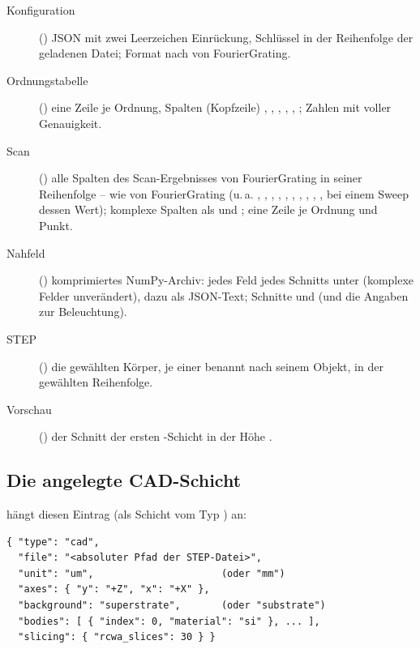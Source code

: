 \begin{description}
  \item[Konfiguration] () JSON mit zwei Leerzeichen Einrückung, Schlüssel in
    der Reihenfolge der geladenen Datei; Format nach  von
    FourierGrating.
  \item[Ordnungstabelle] () eine Zeile je Ordnung, Spalten (Kopfzeile) , , , , , ; Zahlen mit voller Genauigkeit.
  \item[Scan] () alle Spalten des Scan-Ergebnisses von FourierGrating in seiner
    Reihenfolge -- wie  von FourierGrating (u.\,a. ,
    , , , , , ,
    , , , bei einem Sweep dessen Wert); komplexe Spalten
    als  und ; eine Zeile je Ordnung und Punkt.
  \item[Nahfeld] () komprimiertes NumPy-Archiv: jedes Feld jedes Schnitts unter
     (komplexe Felder unverändert), dazu  als JSON-Text;
    Schnitte  und  (und die Angaben zur Beleuchtung).
  \item[STEP] () die gewählten Körper, je einer benannt nach seinem Objekt, in der
    gewählten Reihenfolge.
  \item[Vorschau] () der Schnitt der ersten -Schicht in der Höhe
    .
\end{description}

\subsection{Die angelegte CAD-Schicht}

 hängt diesen Eintrag (als Schicht vom Typ ) an:

\begin{lstlisting}
{ "type": "cad",
  "file": "<absoluter Pfad der STEP-Datei>",
  "unit": "um",                      (oder "mm")
  "axes": { "y": "+Z", "x": "+X" },
  "background": "superstrate",       (oder "substrate")
  "bodies": [ { "index": 0, "material": "si" }, ... ],
  "slicing": { "rcwa_slices": 30 } }
\end{lstlisting}

